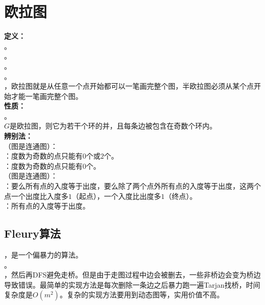 \documentclass[a4paper]{book}
\begin{document}
\section{欧拉图}
\noindent\textbf{定义：}\\
。\\
。\\
。\\
。\\
，欧拉图就是从任意一个点开始都可以一笔画完整个图，半欧拉图必须从某个点开始才能一笔画完整个图。\\
\noindent\textbf{性质：}\\
。\\
$G$是欧拉图，则它为若干个环的并，且每条边被包含在奇数个环内。\\
\noindent\textbf{辨别法：}\\
（图是连通图）：\\
：度数为奇数的点只能有$0$个或$2$个。\\
：度数为奇数的点只能有$0$个。\\
（图是连通图）：\\
：要么所有点的入度等于出度，要么除了两个点外所有点的入度等于出度，这两个点一个出度比入度多$1$（起点），一个入度比出度多$1$（终点）。\\
：所有点的入度等于出度。
\subsection{Fleury算法}
，是一个偏暴力的算法。\\
。\\
，然后再DFS避免走桥。但是由于走图过程中边会被删去，一些非桥边会变为桥边导致错误。最简单的实现方法是每次删除一条边之后暴力跑一遍Tarjan找桥，时间复杂度是$O(m^2)$。复杂的实现方法要用到动态图等，实用价值不高。
\end{document}
